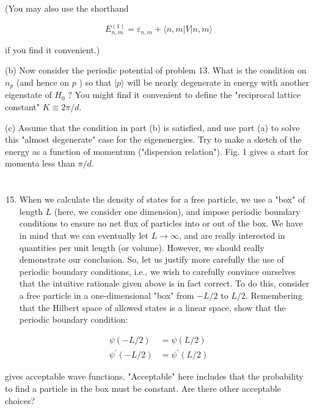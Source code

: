 \documentclass[12pt]{article}
\begin{document}
(You may also use the shorthand

$$
E_{n, m}^{(1)}=\varepsilon_{n, m}+\langle n, m|V| n, m\rangle
$$

if you find it convenient.)

(b) Now consider the periodic potential of problem 13. What is the condition on $n_{p}$ (and hence on $p$ ) so that $|p\rangle$ will be nearly degenerate in energy with another eigenstate of $H_{0}$ ? You might find it convenient to define the "reciprocal lattice constant" $K \equiv 2 \pi / d$.

(c) Assume that the condition in part (b) is satisfied, and use part (a) to solve this "almost degenerate" case for the eigenenergies. Try to make a sketch of the energy as a function of momentum ("dispersion relation"). Fig. 1 gives a start for momenta less than $\pi / d$.
\section{}
\begin{enumerate}
  \setcounter{enumi}{14}
  \item When we calculate the density of states for a free particle, we use a "box" of length $L$ (here, we consider one dimension), and impose periodic boundary conditions to ensure no net flux of particles into or out of the box. We have in mind that we can eventually let $L \rightarrow \infty$, and are really interested in quantities per unit length (or volume). However, we should really demonstrate our conclusion. So, let us justify more carefully the use of periodic boundary conditions, i.e., we wish to carefully convince ourselves that the intuitive rationale given above is in fact correct. To do this, consider a free particle in a one-dimensional "box" from $-L / 2$ to $L / 2$. Remembering that the Hilbert space of allowed states is a linear space, show that the periodic boundary condition:
\end{enumerate}

$$
\begin{aligned}
\psi(-L / 2) & =\psi(L / 2) \\
\psi^{\prime}(-L / 2) & =\psi^{\prime}(L / 2)
\end{aligned}
$$

gives acceptable wave functions. "Acceptable" here includes that the probability to find a particle in the box must be constant. Are there other acceptable choices?
\end{document}
